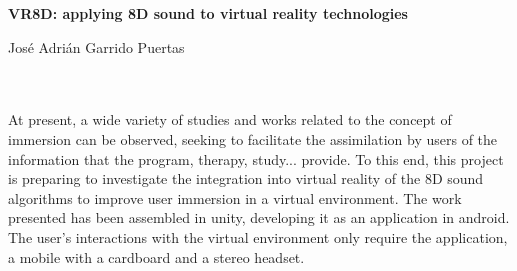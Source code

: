 \thispagestyle{empty}

\begin{center}
	{\large\bfseries VR8D: applying 8D sound to virtual reality technologies }\\
\end{center}

\begin{center}
	José Adrián Garrido Puertas\\
\end{center}

\begin{flushleft}
	\\
	
	\vspace{0.7cm}
	\\
	At present, a wide variety of studies and works related to the concept of immersion can be observed, seeking to facilitate the assimilation by users of the information that the program, therapy, study... provide.
	To this end, this project is preparing to investigate the integration into virtual reality of the 8D sound algorithms to improve user immersion in a virtual environment.
	The work presented has been assembled in unity, developing it as an application in android.
	The user's interactions with the virtual environment only require the application, a mobile with a cardboard and a stereo headset.
\end{flushleft}

\newpage


